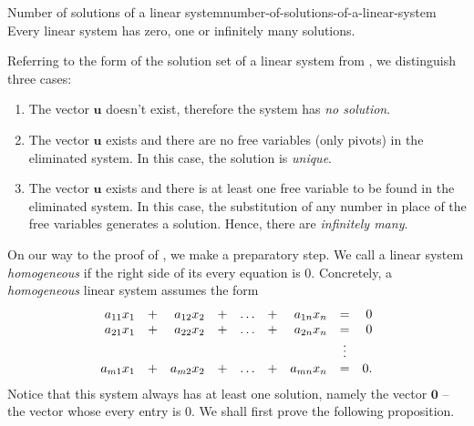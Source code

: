 \begin{corollary}{Number of solutions of a linear system}{number-of-solutions-of-a-linear-system}
 Every linear system has zero, one or infinitely many solutions.
\end{corollary}
\begin{corproof}
 Referring to the form of the solution set of a linear system from
 , we distinguish three
 cases:
 \begin{enumerate}
  \item The vector $\mathbf{u}$ doesn't exist, therefore the system has \emph{no
   solution}.
  \item The vector $\mathbf{u}$ exists and there are no free variables (only
   pivots) in the eliminated system. In this case, the solution is
   \emph{unique}.
  \item The vector $\mathbf{u}$ exists and there is at least one free variable
   to be found in the eliminated system. In this case, the substitution of any
   number in place of the free variables generates a solution. Hence, there are
   \emph{infinitely many}.
 \end{enumerate}
\end{corproof}

On our way to the proof of ,
we make a preparatory step. We call a linear system \emph{homogeneous} if the
right side of its every equation is $0$. Concretely, a \emph{homogeneous} linear
system assumes the form
\[
 \begin{array}{r c r c c c r c r}
  a_{11}x_1 & + & a_{12}x_2 & + & \ldots & + & a_{1n}x_n & = & 0\\
  a_{21}x_1 & + & a_{22}x_2 & + & \ldots & + & a_{2n}x_n & = & 0\\
            &   &           &   &        &   &           & \vdots & \\
  a_{m1}x_1 & + & a_{m2}x_2 & + & \ldots & + & a_{mn}x_n & = & 0.
 \end{array}
\]
Notice that this system always has at least one solution, namely the vector
$\mathbf{0}$ -- the vector whose every entry is $0$. We shall first prove the
following proposition.

